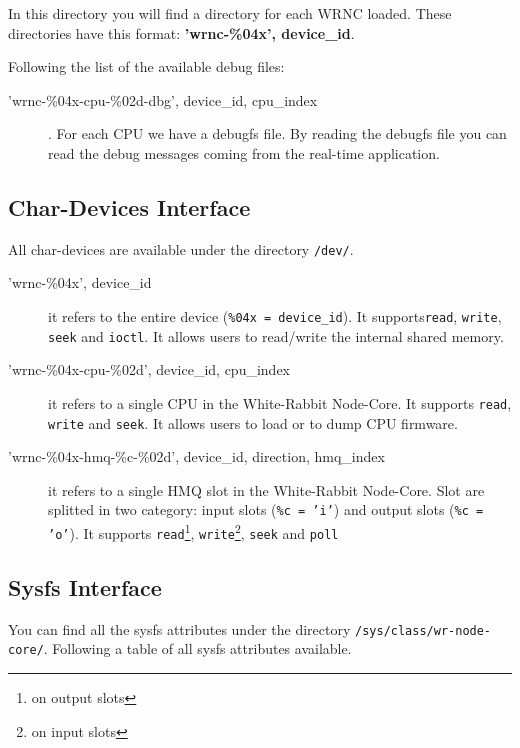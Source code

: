 \documentclass[a4paper,10pt]{article}
\begin{document}
In this directory you will find a directory for each WRNC loaded. These
directories have this format: \textbf{'wrnc-\%04x', device\_id}.

Following the list of the available debug files:
\begin{description}
  \item['wrnc-\%04x-cpu-\%02d-dbg', device\_id, cpu\_index]. For each
CPU we have a debugfs file. By reading the debugfs file you can
read the debug messages coming from the real-time application.
\end{description}

\subsection{Char-Devices Interface} %
All char-devices are available under the directory \texttt{/dev/}.

\begin{description}
 \item['wrnc-\%04x', device\_id] it refers to the entire device 
(\texttt{\%04x = device\_id}). It supports\texttt{read}, 
\texttt{write}, \texttt{seek} and \texttt{ioctl}. It allows users to 
read/write the internal shared memory.
 
 \item['wrnc-\%04x-cpu-\%02d', device\_id, cpu\_index] it refers to a 
single CPU in the
 White-Rabbit Node-Core. It supports \texttt{read}, \texttt{write} and 
\texttt{seek}. It allows users to load or to dump CPU firmware.
 
 \item['wrnc-\%04x-hmq-\%c-\%02d', device\_id, direction, hmq\_index] 
it refers to a single HMQ slot in
the White-Rabbit Node-Core. Slot are splitted in two category: input 
slots (\texttt{\%c = 'i'}) and output slots (\texttt{\%c = 'o'}). It 
supports \texttt{read}\footnote{on output slots}, 
\texttt{write}\footnote{on input slots}, \texttt{seek} and 
\texttt{poll}
\end{description}

\subsection{Sysfs Interface}%
You can find all the sysfs attributes under the directory 
\texttt{/sys/class/wr-node-core/}. Following a table of all sysfs 
attributes available.
\end{document}
